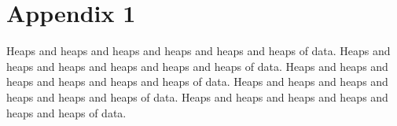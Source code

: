 \chapter*{Appendix 1}\label{app1}

Heaps and heaps and heaps and heaps and heaps and heaps of data.
Heaps and heaps and heaps and heaps and heaps and heaps of data.
Heaps and heaps and heaps and heaps and heaps and heaps of data.
Heaps and heaps and heaps and heaps and heaps and heaps of data.
Heaps and heaps and heaps and heaps and heaps and heaps of data.
